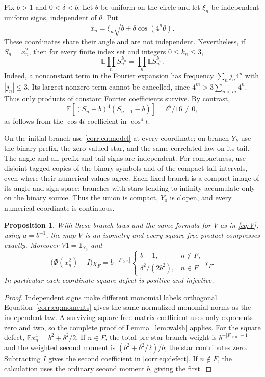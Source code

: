 \documentclass[11pt,letterpaper]{amsart}
\newtheorem{proposition}[theorem]{Proposition}
\theoremstyle{definition}
\theoremstyle{remark}
\numberwithin{equation}{section}
\newcommand{\ind}{\mathbf 1}
\begin{document}
Fix $b>1$ and $0<\delta<b$. Let $\theta$ be uniform on the circle and
let $\xi_n$ be independent uniform signs, independent of $\theta$. Put
\begin{equation}\label{corr:eq:model}
                   x_n=\xi_n\sqrt{b+\delta\cos(4^n\theta)}.
\end{equation}
These coordinates share their angle and are not independent.
Nevertheless, if $S_n=x_n^2$, then for every finite index set and
integers $0\le k_n\le3$,
\begin{equation}\label{corr:eq:moments}
                   \mathbb E\prod_n S_n^{k_n}
                      =\prod_n\mathbb E S_n^{k_n}.
\end{equation}
Indeed, a nonconstant term in the Fourier expansion has frequency
$\sum_n j_n4^n$ with $|j_n|\le3$. Its largest nonzero term cannot be
cancelled, since $4^m>3\sum_{n<m}4^n$. Thus only products of constant
Fourier coefficients survive. By contrast,
\[
 \mathbb E[(S_n-b)^4(S_{n+1}-b)]=\delta^5/16\ne0,
\]
as follows from the $\cos4t$ coefficient in $\cos^4t$.

On the initial branch use \eqref{corr:eq:model} at every coordinate;
on branch $Y_k$ use the binary prefix, the zero-valued star, and the
same correlated law on its tail. The angle and all prefix and tail
signs are independent. For compactness, use disjoint tagged copies of
the binary symbols and of the compact tail intervals, even where their
numerical values agree. Each fixed branch is a compact image of its
angle and sign space; branches with stars tending to infinity
accumulate only on the binary source. Thus the union is compact,
$Y_0$ is clopen, and every numerical coordinate is continuous.

\begin{proposition}\label{corr:prop:compression}
With these branch laws and the same formula for $V$ as in
\eqref{eq:V}, using $a=b^{-1}$, the map $V$ is an isometry and every
square-free product compresses exactly. Moreover $V1=\ind_{Y_0}$ and
\begin{equation}\label{corr:eq:defect}
 \bigl(\Phi(x_n^2)-I\bigr)\chi_F
  =b^{-|F_{>n}|}
  \begin{cases}
   b-1,&n\notin F,\\
   \delta^2/(2b^2),&n\in F
  \end{cases}\chi_F.
\end{equation}
In particular each coordinate-square defect is positive and injective.
\end{proposition}
\begin{proof}
Independent signs make different monomial labels orthogonal.
Equation~\eqref{corr:eq:moments} gives the same normalized monomial
norms as the independent law. A surviving square-free matrix coefficient
uses only exponents zero and two, so the complete proof of
Lemma~\ref{lem:walsh} applies.
For the square defect, $\mathbb E x_n^4=b^2+\delta^2/2$.
If $n\in F$, the total pre-star branch weight is
$b^{-|F_{>n}|-1}$ and the weighted second moment is
$(b^2+\delta^2/2)/b$; the star contributes zero. Subtracting $I$
gives the second coefficient in \eqref{corr:eq:defect}. If $n\notin F$,
the calculation uses the ordinary second moment $b$, giving the first.
\end{proof}
\end{document}
